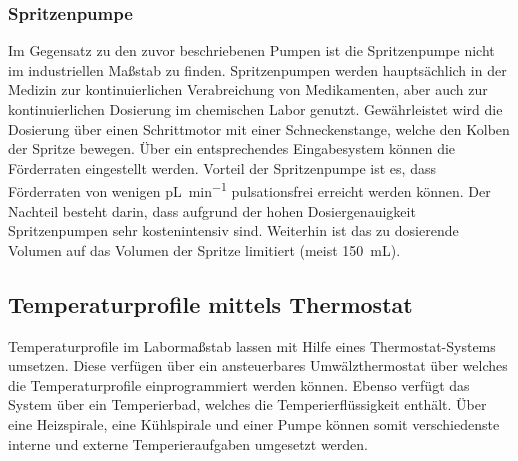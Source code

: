 \subsubsection*{Spritzenpumpe}
Im Gegensatz zu den zuvor beschriebenen Pumpen ist die Spritzenpumpe nicht im industriellen Maßstab zu finden. Spritzenpumpen werden hauptsächlich in der Medizin zur kontinuierlichen Verabreichung von Medikamenten, aber auch zur kontinuierlichen Dosierung im chemischen Labor genutzt. Gewährleistet wird die Dosierung über einen Schrittmotor mit einer Schneckenstange, welche den Kolben der Spritze bewegen. Über ein entsprechendes Eingabesystem können die Förderraten eingestellt werden. Vorteil der Spritzenpumpe ist es, dass Förderraten von wenigen \si{\pico \liter \per \minute} pulsationsfrei erreicht werden können. 
\newpage
Der Nachteil besteht darin, dass aufgrund der hohen Dosiergenauigkeit Spritzenpumpen sehr kostenintensiv sind. Weiterhin ist das zu dosierende Volumen auf das Volumen der Spritze limitiert (meist \SI{150}{\milli \liter}). 

\subsection{Temperaturprofile mittels Thermostat}
Temperaturprofile im Labormaßstab lassen mit Hilfe eines Thermostat-Systems umsetzen. Diese verfügen über ein ansteuerbares Umwälzthermostat über welches die Temperaturprofile einprogrammiert werden können. Ebenso verfügt das System über ein  Temperierbad, welches die Temperierflüssigkeit enthält. Über eine Heizspirale, eine Kühlspirale und einer Pumpe können somit verschiedenste interne und externe Temperieraufgaben umgesetzt werden.
